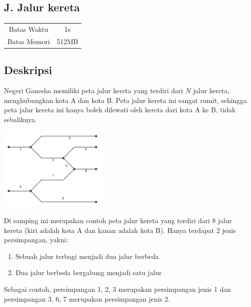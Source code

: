 \documentclass{article}
\begin{document}
\begin{center}
    \section*{J. Jalur kereta}

    \begin{tabular}{ | c c | }
        \hline
        Batas Waktu  & 1s \\
        Batas Memori & 512MB \\
        \hline
    \end{tabular}
\end{center}

\subsection*{Deskripsi}

Negeri Ganesha memiliki peta jalur kereta yang terdiri dari $N$ jalur kereta, menghubungkan kota A dan kota B.
Peta jalur kereta ini sangat rumit, sehingga peta jalur kereta ini hanya boleh dilewati oleh kereta dari kota A ke B, tidak sebaliknya.

\begin{multicols}{2}
\begin{center}
    \includegraphics[width=200px]{sample-1}
\end{center}

Di samping ini merupakan contoh peta jalur kereta yang terdiri dari 8 jalur kereta (kiri adalah kota A dan kanan adalah kota B).
Hanya terdapat 2 jenis persimpangan, yakni:
\begin{enumerate}
    \setlength{\itemsep}{0pt}
    \item Sebuah jalur terbagi menjadi dua jalur berbeda
    \item Dua jalur berbeda bergabung menjadi satu jalur
\end{enumerate}
Sebagai contoh, persimpangan 1, 2, 3 merupakan persimpangan jenis 1 dan persimpangan 3, 6, 7 merupakan persimpangan jenis 2.
\end{multicols}
\end{document}
